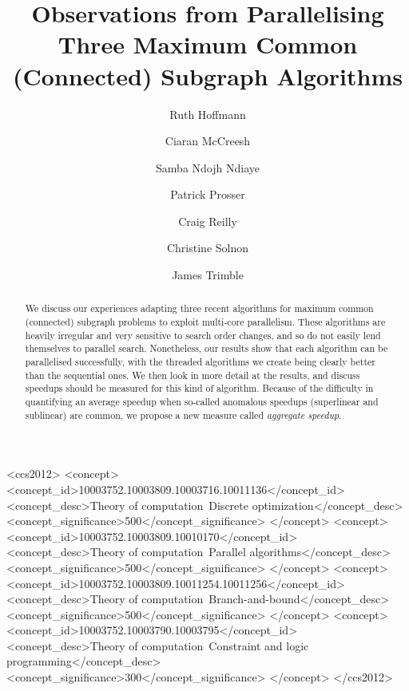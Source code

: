 \documentclass[sigconf]{acmart}
\begin{document}
\title[Observations from Parallelising Three Subgraph Algorithms]{Observations from Parallelising Three Maximum Common (Connected) Subgraph Algorithms}

\author{Ruth Hoffmann}

\author{Ciaran McCreesh}

\author{Samba Ndojh Ndiaye}

\author{Patrick Prosser}

\author{Craig Reilly}

\author{Christine Solnon}

\author{James Trimble}

\renewcommand{\shortauthors}{R. Hoffmann, C. McCreesh et al.}

\begin{abstract}
    We discuss our experiences adapting three recent algorithms for maximum common (connected)
    subgraph problems to exploit multi-core parallelism. These algorithms are heavily irregular and
    very sensitive to search order changes, and so do not easily lend themselves to parallel search.
    Nonetheless, our results show that each algorithm can be parallelised successfully, with the
    threaded algorithms we create being clearly better than the sequential ones. We then look in
    more detail at the results, and discuss speedups should be measured for this kind of algorithm.
    Because of the difficulty in quantifying an average speedup when so-called anomalous
    speedups (superlinear and sublinear) are common, we propose a new measure called \emph{aggregate
    speedup}.
\end{abstract}

\begin{CCSXML}
<ccs2012>
<concept>
<concept_id>10003752.10003809.10003716.10011136</concept_id>
<concept_desc>Theory of computation~Discrete optimization</concept_desc>
<concept_significance>500</concept_significance>
</concept>
<concept>
<concept_id>10003752.10003809.10010170</concept_id>
<concept_desc>Theory of computation~Parallel algorithms</concept_desc>
<concept_significance>500</concept_significance>
</concept>
<concept>
<concept_id>10003752.10003809.10011254.10011256</concept_id>
<concept_desc>Theory of computation~Branch-and-bound</concept_desc>
<concept_significance>500</concept_significance>
</concept>
<concept>
<concept_id>10003752.10003790.10003795</concept_id>
<concept_desc>Theory of computation~Constraint and logic programming</concept_desc>
<concept_significance>300</concept_significance>
</concept>
</ccs2012>
\end{CCSXML}
\end{document}
